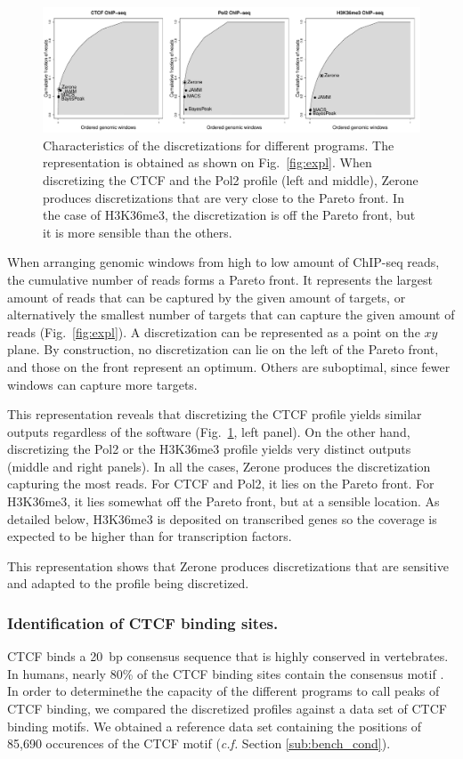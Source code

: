 \documentclass{bioinfo}
\begin{document}
\begin{figure}
\centerline{\includegraphics[scale=0.4]{pareto_front.pdf}}
\caption{
  Characteristics of the discretizations for different programs.
  The representation is obtained as shown on Fig.~\ref{fig:expl}.
  When discretizing the CTCF and the Pol2 profile (left and middle),
  Zerone produces discretizations that are very close to the Pareto
  front. In the case of H3K36me3, the discretization is off the
  Pareto front, but it is more sensible than the others.
}
\label{fig:pareto}
\end{figure}

When arranging genomic windows from high to low amount of ChIP-seq
reads, the cumulative number of reads forms a Pareto front.
It represents the largest amount of reads that can be captured by the
given amount of targets, or alternatively the smallest number of
targets that can capture the given amount of reads
(Fig.~\ref{fig:expl}). A discretization can be represented as a point
on the $xy$ plane.  By construction, no discretization can lie on the
left of the Pareto front, and those on the front represent an
optimum. Others are suboptimal, since fewer windows can capture more
targets.

This representation reveals that discretizing the CTCF profile yields
similar outputs regardless of the software (Fig.~\ref{fig:pareto},
left panel). On the other hand, discretizing the Pol2 or the H3K36me3
profile yields very distinct outputs (middle and right panels). In
all the cases, Zerone produces the discretization capturing the most
reads. For CTCF and Pol2, it lies on the Pareto front. For H3K36me3,
it lies somewhat off the Pareto front, but at a sensible location.
As detailed below, H3K36me3 is deposited on transcribed genes
\citep{pmid16122420,pmid23739122} so the coverage is expected to
be higher than for transcription factors.

This representation shows that Zerone produces discretizations that
are sensitive and adapted to the profile being discretized.

\subsubsection{Identification of CTCF binding sites.}
CTCF binds a 20~bp consensus sequence that is highly conserved in
vertebrates. In humans, nearly 80\% of the CTCF binding sites contain
the consensus motif \citep{pmid17382889}. In order to determinethe the
capacity of the different programs to call peaks of CTCF binding, we
compared the discretized profiles against a data set of CTCF binding
motifs. We obtained a reference data set containing the positions of
85,690 occurences of the CTCF motif (\textit{c.f.} Section
\ref{sub:bench_cond}).
\end{document}

